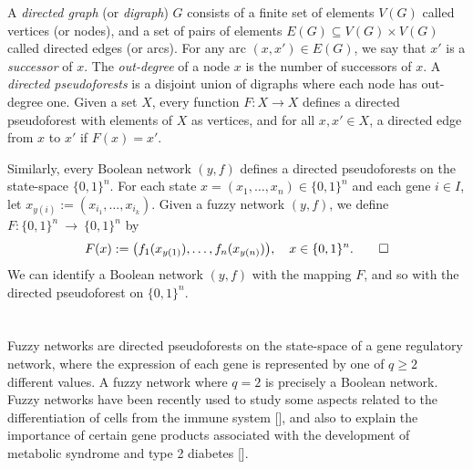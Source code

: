 \documentclass[letterpaper]{article}
\begin{document}
A \emph{directed graph} (or \emph{digraph}) $G$ consists of a finite set of elements $V(G)$ called vertices (or nodes), and a set of pairs of elements $E(G)\subseteq V(G)\times V(G)$ called directed edges (or arcs).  
For any arc $(x,x')\in E(G)$, we say that $x'$ is a \emph{successor} of $x$. %
The \emph{out-degree} of a node $x$ is the number %
 of successors of $x$. 
A \emph{directed pseudoforests} is a disjoint union of digraphs where each node has out-degree one. 
Given a set $X$, every function $F\colon X\to X$  defines a directed pseudoforest with elements of $X$
as vertices, and for all $x,x'\in X$, a directed edge from $x$ to $x'$ if $F(x)=x'$.


Similarly, every Boolean network $(y,f)$ defines a directed pseudoforests
on the state-space $\{0,1\}^n$.
For each state $x=(x_1,\dots, x_n)\in \{0,1\}^n$ and each gene $i\in I$, let $x_{y(i)}:=(x_{i_1},\dots,x_{i_k})$. 
Given  a fuzzy network $(y,f)$,  we define  $F\colon \{0,1\}^n\ \to\ \{0,1\}^n$ by  
\[
F(x):=\big(
 f_1( x_{y(1)}), \dots,
 f_n( x_{y(n)})
\big),\quad x\in \{0,1\}^n.\qedhere
\]
We can identify a Boolean network $(y,f)$ with the mapping $F$, and so with the directed pseudoforest on $\{0,1\}^n$.
  
\section{}
Fuzzy networks are directed pseudoforests on the state-space of a gene regulatory network, where the expression of each gene is represented by one of $q\geq 2$ different values. 
A fuzzy network where $q=2$ is precisely a Boolean network.
 Fuzzy networks have been recently used to study some aspects related to the differentiation of cells from the immune system [], and also to explain the importance of certain gene products associated with the development of metabolic syndrome and type 2 diabetes [].  
\end{document}
